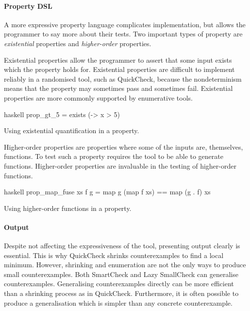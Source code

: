 \paragraph{Property DSL}
A more expressive property language complicates implementation, but
allows the programmer to say more about their tests.  Two important
types of property are \emph{existential} properties and
\emph{higher-order} properties.

Existential properties allow the programmer to assert that some input
exists which the property holds for.  Existential properties are
difficult to implement reliably in a randomised tool, such as
QuickCheck, because the nondeterminism means that the property may
sometimes pass and sometimes fail.  Existential properties are more
commonly supported by enumerative tools.

\begin{listing}
\centering
\begin{cminted}{haskell}
prop_gt_5 = exists (\x -> x > 5)
\end{cminted}
\caption{Using existential quantification in a property.}\label{lst:prop_gt_5}
\end{listing}

Higher-order properties are properties where some of the inputs are,
themselves, functions.  To test such a property requires the tool to
be able to generate functions.  Higher-order properties are invaluable
in the testing of higher-order functions.

\begin{listing}
\centering
\begin{cminted}{haskell}
prop_map_fuse xs f g = map g (map f xs) == map (g . f) xs
\end{cminted}
\caption{Using higher-order functions in a property.}\label{lst:prop_map_fuse}
\end{listing}

\paragraph{Output}
Despite not affecting the expressiveness of the tool, presenting
output clearly is essential.  This is why
QuickCheck\cite{claessen2000} shrinks counterexamples to find a local
minimum.  However, shrinking and enumeration are not the only ways to
produce small counterexamples.  Both SmartCheck\cite{pike2014} and
Lazy SmallCheck\cite{runciman2008} can generalise counter\-examples.
Generalising counterexamples directly can be more efficient than a
shrinking process as in QuickCheck\cite{pike2014}.  Furthermore, it is
often possible to produce a generalisation which is simpler than any
concrete counterexample.

